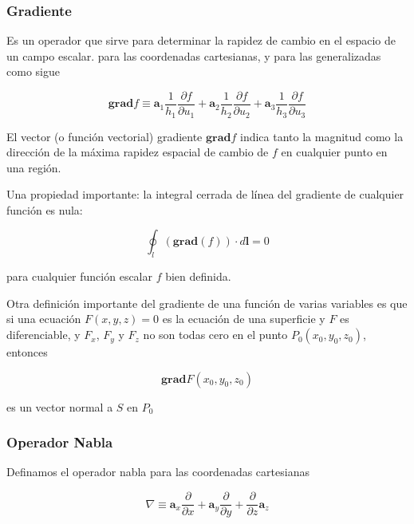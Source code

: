 \subsubsection{Gradiente}

Es un operador que sirve para determinar la rapidez de cambio en el espacio de un campo escalar.
para las coordenadas cartesianas, y para las generalizadas como sigue

\begin{equation*}
\textbf{grad} f \equiv \mathbf{a}_1 \frac{1}{h_1} \frac{\partial f }{\partial  u_1} + \mathbf{a}_2 \frac{1}{h_2} \frac{\partial f }{\partial u_2} + \mathbf{a}_3 \frac{1}{h_3} \frac{\partial f }{\partial u_3 }
\end{equation*}

El vector (o función vectorial) gradiente $\textbf{grad} f$ indica tanto la magnitud como la dirección de la máxima rapidez espacial de cambio de $f$ en cualquier punto en una región.

Una propiedad importante: la integral cerrada de línea del gradiente de cualquier función es nula:

\begin{equation*}
\oint_l (\textbf{grad} (f)) \cdot d \mathbf{l} = 0
\end{equation*}

para cualquier función escalar $f$ bien definida.

Otra definición importante del gradiente de una función de varias variables es que si una ecuación $F(x,y,z)=0$ es la ecuación de una superficie y $F$ es diferenciable, y $F_x$, $F_y$ y $F_z$ no son todas cero en el punto $P_0(x_0,y_0,z_0)$, entonces 

\begin{equation*}
\textbf{grad}F(x_0,y_0,z_0)
\end{equation*}

es un vector normal a $S$ en $P_0$


\subsubsection{Operador Nabla}

 Definamos el operador nabla para las coordenadas cartesianas

\begin{equation*}
\nabla \equiv \mathbf{a}_x \frac{\partial  }{\partial  x} + \mathbf{a}_y \frac{\partial  }{\partial y } + \frac{\partial  }{\partial z }\mathbf{a}_z
\end{equation*}

